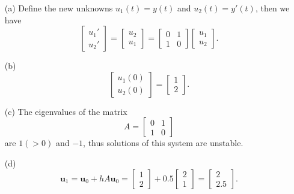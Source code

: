 \documentclass[a4paper]{book}
\makeatletter
\newenvironment{sol}[1][\solname]{\par
  \pushQED{\qed}
  \normalfont \topsep6\p@\@plus6\p@\relax
  \trivlist
  \item[\hskip\labelsep
        \itshape
    #1\@addpunct{.}]\ignorespaces
}{\popQED\endtrivlist\@endpefalse}
\providecommand{\solname}{Solution}
\numberwithin{equation}{chapter}
\theoremstyle{definition}
\makeatother
\begin{document}
  \begin{sol}
    \begin{itemize}
      \item[(a)]
    Define the new unknowns $u_1(t)=y(t)$ and $u_2(t)=y'(t)$,
    then we have
    \begin{displaymath}
      \begin{bmatrix}
        u_1' \\
        u_2'
      \end{bmatrix}
      =
      \begin{bmatrix}
        u_2 \\
        u_1
      \end{bmatrix}
      =
      \begin{bmatrix}
        0 & 1 \\
        1 & 0
      \end{bmatrix}
      \begin{bmatrix}
        u_1 \\
        u_2
      \end{bmatrix}.
    \end{displaymath}
  
  \item[(b)]
    \begin{displaymath}
      \begin{bmatrix}
        u_1(0) \\
        u_2(0)
      \end{bmatrix}
      =
      \begin{bmatrix}
        1 \\
        2
      \end{bmatrix}.
    \end{displaymath}
  
  \item[(c)]
    The eigenvalues of the matrix
    \begin{displaymath}
      A = 
      \begin{bmatrix}
        0 & 1 \\
        1 & 0
      \end{bmatrix}
    \end{displaymath}
    are $1(>0)$ and $-1$,
    thus solutions of this system are unstable.
  
  \item[(d)]
    \begin{displaymath}
      \mathbf{u}_1 = \mathbf{u}_0 + hA\mathbf{u}_0 =
      \begin{bmatrix}
        1 \\ 2
      \end{bmatrix}
      +
      0.5
      \begin{bmatrix}
        2 \\ 1
      \end{bmatrix}
      =
      \begin{bmatrix}
        2 \\ 2.5
      \end{bmatrix}.
    \end{displaymath}
  

\end{itemize}
\end{sol}
\end{document}
